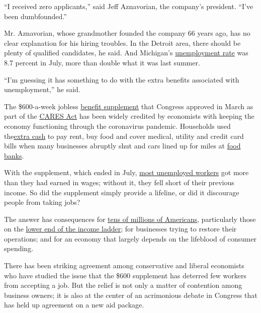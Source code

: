 ``I received zero applicants,'' said Jeff Aznavorian, the company's
president. ``I've been dumbfounded.''

Mr. Aznavorian, whose grandmother founded the company 66 years ago, has
no clear explanation for his hiring troubles. In the Detroit area, there
should be plenty of qualified candidates, he said. And Michigan's
\href{https://www.michigan.gov/dtmb/0,5552,7-358-82546_9352_99726-537169--,00.html}{unemployment
rate} was 8.7 percent in July, more than double what it was last summer.

``I'm guessing it has something to do with the extra benefits associated
with unemployment,'' he said.

The \$600-a-week jobless
\href{https://www.nytimes3xbfgragh.onion/article/coronavirus-stimulus-package-questions-answers.html?action=click\&module=RelatedLinks\&pgtype=Article}{benefit
supplement} that Congress approved in March as part of the
\href{https://www.nytimes3xbfgragh.onion/2020/03/27/us/politics/coronavirus-house-voting.html}{CARES
Act} has been widely credited by economists with keeping the economy
functioning through the coronavirus pandemic. Households used
the\href{https://www.nytimes3xbfgragh.onion/2020/07/29/business/economy/unemployment-benefits-coronavirus.html}{extra
cash} to pay rent, buy food and cover medical, utility and credit card
bills when many businesses abruptly shut and cars lined up for miles at
\href{https://www.nytimes3xbfgragh.onion/2020/04/08/business/economy/coronavirus-food-banks.html}{food
banks}.

With the supplement, which ended in July,
\href{https://bfi.uchicago.edu/working-paper/2020-62/}{most unemployed
workers} got more than they had earned in wages; without it, they fell
short of their previous income. So did the supplement simply provide a
lifeline, or did it discourage people from taking jobs?

The answer has consequences for
\href{https://www.nytimes3xbfgragh.onion/2020/08/08/business/economy/lost-unemployment-benefits.html}{tens
of millions of Americans}, particularly those on the
\href{https://www.nytimes3xbfgragh.onion/2020/08/07/upshot/unemployment-benefits-racial-disparity.html}{lower
end of the income ladder}; for businesses trying to restore their
operations; and for an economy that largely depends on the lifeblood of
consumer spending.

There has been striking agreement among conservative and liberal
economists who have studied the issue that the \$600 supplement has
deterred few workers from accepting a job. But the relief is not only a
matter of contention among business owners; it is also at the center of
an acrimonious debate in Congress that has held up agreement on a new
aid package.

